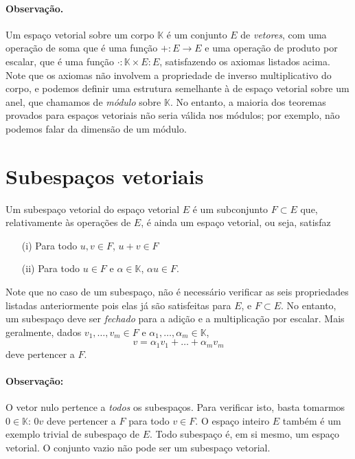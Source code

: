 \paragraph*{Observação.} Um espaço vetorial sobre um corpo ${\mathbb{K}}$ é um conjunto $E$ de \emph{vetores}, com uma operação de soma que é uma função $+:E\to E$ e uma operação de produto por escalar, que é uma função $\cdot: {\mathbb{K}}\times E:E$, satisfazendo os axiomas listados acima. Note que os axiomas não involvem a propriedade de inverso multiplicativo do corpo, e podemos definir uma estrutura semelhante à de espaço vetorial sobre um anel, que chamamos de \emph{módulo} sobre ${\mathbb{K}}$. No entanto, a maioria dos teoremas provados para espaços vetoriais não seria válida nos módulos; por exemplo, não podemos falar da dimensão de um módulo.

\section{Subespaços vetoriais}

\begin{defi}
  Um subespaço vetorial do espaço vetorial $E$ é um subconjunto $F\subset E$ que, relativamente às operações de $E$, é ainda um espaço vetorial, ou seja, satisfaz 
  \begin{itemize}
  \item[(i)] Para todo $u,v \in F$, $u+v \in F$
  \item[(ii)] Para todo $u\in F$ e $\alpha \in {\mathbb{K}}$, $\alpha u \in F$.
  \end{itemize}
\end{defi}

Note que no caso de um subespaço, não é necessário verificar as seis propriedades listadas anteriormente pois elas já são satisfeitas para $E$, e $F \subset E$. No entanto, um subespaço deve ser \emph{fechado} para a adição e a multiplicação por escalar. Mais geralmente, dados $v_1,\ldots,v_m \in F$ e $\alpha_1,\ldots,\alpha_m \in {\mathbb{K}}$, 
\begin{equation*}
   v = \alpha_1v_1+\ldots+\alpha_mv_m
\end{equation*}
deve pertencer a $F$.

\paragraph*{Observação:} O vetor nulo pertence a \emph{todos} os subespaços. Para verificar isto, basta tomarmos $0 \in {\mathbb{K}}$: $0v$ deve pertencer a $F$ para todo $v\in F$. O espaço inteiro $E$ também é um exemplo trivial de subespaço de $E$. Todo subespaço é, em si mesmo, um espaço vetorial. O conjunto vazio não pode ser um subespaço vetorial.

